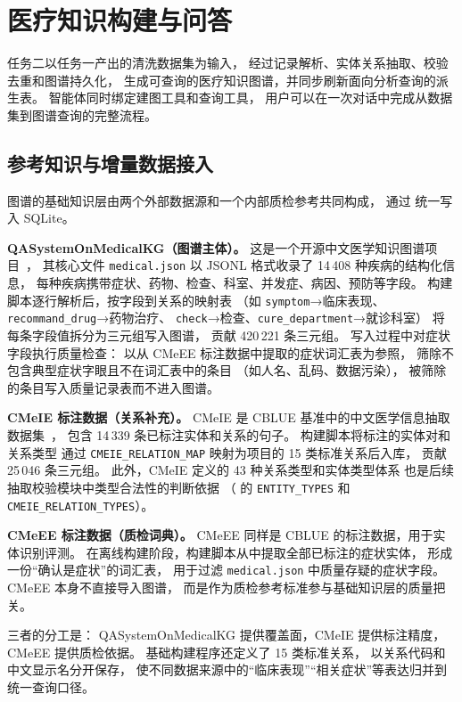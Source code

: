 \chapter{医疗知识构建与问答}

任务二以任务一产出的清洗数据集为输入，
经过记录解析、实体关系抽取、校验去重和图谱持久化，
生成可查询的医疗知识图谱，并同步刷新面向分析查询的派生表。
智能体同时绑定建图工具和查询工具，
用户可以在一次对话中完成从数据集到图谱查询的完整流程。

\section{参考知识与增量数据接入}

图谱的基础知识层由两个外部数据源和一个内部质检参考共同构成，
通过  统一写入 SQLite。

\textbf{QASystemOnMedicalKG（图谱主体）。}
这是一个开源中文医学知识图谱项目~\cite{qasystemkg}，
其核心文件 \texttt{medical.json} 以 JSONL 格式收录了 14\,408 种疾病的结构化信息，
每种疾病携带症状、药物、检查、科室、并发症、病因、预防等字段。
构建脚本逐行解析后，按字段到关系的映射表
（如 \texttt{symptom}→临床表现、\texttt{recommand\_drug}→药物治疗、
\texttt{check}→检查、\texttt{cure\_department}→就诊科室）
将每条字段值拆分为三元组写入图谱，
贡献 420\,221 条三元组。
写入过程中对症状字段执行质量检查：
以从 CMeEE 标注数据中提取的症状词汇表为参照，
筛除不包含典型症状字眼且不在词汇表中的条目
（如人名、乱码、数据污染），
被筛除的条目写入质量记录表而不进入图谱。

\textbf{CMeIE 标注数据（关系补充）。}
CMeIE 是 CBLUE 基准中的中文医学信息抽取数据集~\cite{cblue2022}，
包含 14\,339 条已标注实体和关系的句子。
构建脚本将标注的实体对和关系类型
通过 \texttt{CMEIE\_RELATION\_MAP} 映射为项目的 15 类标准关系后入库，
贡献 25\,046 条三元组。
此外，CMeIE 定义的 43 种关系类型和实体类型体系
也是后续抽取校验模块中类型合法性的判断依据
（ 的 \texttt{ENTITY\_TYPES} 和 \texttt{CMEIE\_RELATION\_TYPES}）。

\textbf{CMeEE 标注数据（质检词典）。}
CMeEE 同样是 CBLUE 的标注数据，用于实体识别评测。
在离线构建阶段，构建脚本从中提取全部已标注的症状实体，
形成一份“确认是症状”的词汇表，
用于过滤 \texttt{medical.json} 中质量存疑的症状字段。
CMeEE 本身不直接导入图谱，
而是作为质检参考标准参与基础知识层的质量把关。

三者的分工是：
QASystemOnMedicalKG 提供覆盖面，CMeIE 提供标注精度，
CMeEE 提供质检依据。
基础构建程序还定义了 15 类标准关系，
以关系代码和中文显示名分开保存，
使不同数据来源中的“临床表现”“相关症状”等表达归并到统一查询口径。

